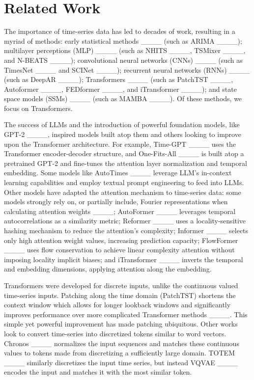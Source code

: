 \section{Related Work}
The importance of time-series data has led to decades of work, resulting in a myriad of methods: early statistical methods ____ (such as ARIMA ____); multilayer perceptions (MLP) ____ (such as NHITS ____, TSMixer ____, and N-BEATS ____); convolutional neural networks (CNNs) ____ (such as TimesNet ____ and SCINet ____); recurrent neural networks (RNNs) ____ (such as DeepAR ____); Transformers ____ (such as PatchTST ____, Autoformer ____, FEDformer ____, and iTransformer ____); and state space models (SSMs) ____ (such as MAMBA ____).
Of these methods, we focus on Transformers.

The success of LLMs and the introduction of powerful foundation models, like GPT-2 ____, inspired models built atop them and others looking to improve upon the Transformer architecture.
For example, Time-GPT ____ uses the Transformer encoder-decoder structure, and One-Fits-All ____ is built atop a pretrained GPT-2 and fine-tunes the attention layer normalization and temporal embedding.
Some models like AutoTimes ____ leverage LLM's in-context learning capabilities and employ textual prompt engineering to feed into LLMs.
Other models have adapted the attention mechanism to time-series data: some models strongly rely on, or partially include, Fourier representations when calculating attention weights ____; AutoFormer ____ leverages temporal autocorrelations as a similarity metric; Reformer ____ uses a locality-sensitive hashing mechanism to reduce the attention's complexity; Informer ____ selects only high attention weight values, increasing prediction capacity; FlowFormer ____ uses flow conservation to achieve linear complexity attention without imposing locality implicit biases; and iTransformer ____ inverts the temporal and embedding dimensions, applying attention along the embedding.  

Transformers were developed for discrete inputs, unlike the continuous valued time-series inputs.
Patching along the time domain (PatchTST) shortens the context window which allows for longer lookback windows and significantly improves performance over more complicated Transformer methods ____.
This simple yet powerful improvement has made patching ubiquitous.
Other works look to convert time-series into discretized tokens similar to word vectors.
Chronos ____ normalizes the input sequences and matches these continuous values to tokens made from discretizing a sufficiently large domain.
TOTEM ____ similarly discretizes the input time series, but instead VQVAE ____ encodes the input and matches it with the most similar token.